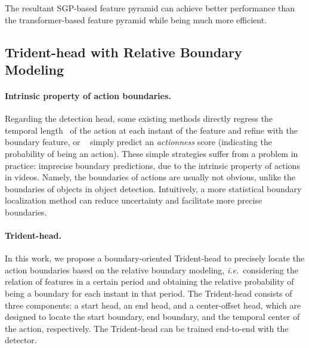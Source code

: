 \documentclass[10pt,twocolumn,letterpaper]{article}
\def\ie{{\em i.e.}}
\def\modulename{SGP}
\begin{document}
The resultant \modulename-based feature pyramid can achieve better performance than the transformer-based feature pyramid while being much more efficient.





\subsection{Trident-head with Relative Boundary Modeling}
\label{sec:head}









\paragraph{Intrinsic property of action boundaries.}
Regarding the detection head, some existing methods directly regress the temporal length~\cite{zhang2022actionformer} of the action at each instant of the feature and refine with the boundary feature\cite{lin2021learning,qing2021temporal}, or ~\cite{lin2018bsn,lin2019bmn,zeng2019graph} simply predict an \emph{actionness} score (indicating the probability of being an action). These simple strategies suffer from a problem in practice: imprecise boundary predictions, due to the intrinsic property of actions in videos. Namely, the boundaries of actions are usually not obvious, unlike the boundaries of objects in object detection. Intuitively, a more statistical boundary localization method can reduce uncertainty and facilitate more precise boundaries.




\begin{figure}[t]
\end{figure}





\paragraph{Trident-head.}
In this work, we propose a boundary-oriented Trident-head to precisely locate the action boundaries based on the relative boundary modeling, \ie~considering the relation of features in a certain period and obtaining the relative probability of being a boundary for each instant in that period. The Trident-head consists of three components: a start head, an end head, and a center-offset head, which are designed to locate the start boundary, end boundary, and the temporal center of the action, respectively. The Trident-head can be trained end-to-end with the detector. 
\end{document}
